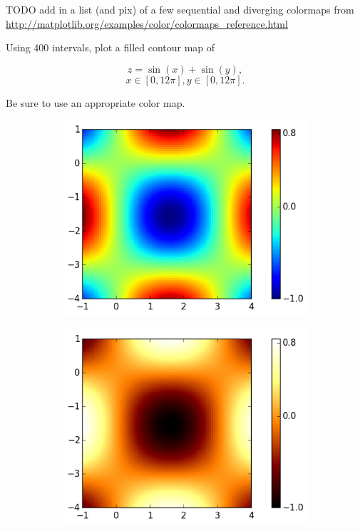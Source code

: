 TODO add in a list (and pix) of a few sequential and diverging colormaps from \url{http://matplotlib.org/examples/color/colormaps_reference.html} 




\begin{problem}
Using 400 intervals, plot a filled contour map of

$$z = \sin(x) + \sin(y),$$ $$ x\in[0,12\pi], y\in[0,12\pi].$$ 

Be sure to use an appropriate color map. 
\end{problem}


\begin{figure}
\centering
\begin{subfigure}{.5\textwidth}
  \centering
  \includegraphics[width=\textwidth]{heatmap_color.png}
\end{subfigure}%
\begin{subfigure}{.5\textwidth}
  \centering
  \includegraphics[width=\textwidth]{heatmap_hot.png}

\end{subfigure}
\end{figure}
